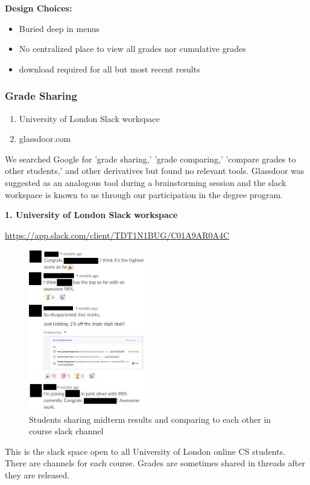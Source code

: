 \documentclass{article}
\begin{document}
\noindent \textbf{Design Choices:}
\begin{itemize}
\item Buried deep in menus
\item No centralized place to view all grades nor cumulative grades
\item download required for all but most recent results
\end{itemize}
\medskip

\subsubsection{Grade Sharing}
\begin{enumerate}
  \item University of London Slack workspace
  \item glassdoor.com
\end{enumerate}

\noindent We searched Google for 'grade sharing,' 'grade comparing,' 'compare grades to other students,' and other derivatives but found no relevant tools. Glassdoor was suggested as an analogous tool during a brainstorming session and the slack workspace is known to us through our participation in the degree program.
\medskip

\noindent \textbf{1. University of London Slack workspace}

\noindent \sloppy \url{https://app.slack.com/client/TDT1N1BUG/C01A9AR0A4C}
\bigskip

\begin{figure}[h]
\noindent \includegraphics[height=200pt]{slack-share}
\centering
\caption{Students sharing midterm results and comparing to each other in course slack channel}
\label{fig: slack-share}
\end{figure}

\noindent This is the slack space open to all University of London online CS students. There are channels for each course. Grades are sometimes shared in threads after they are released.
\bigskip
\end{document}
